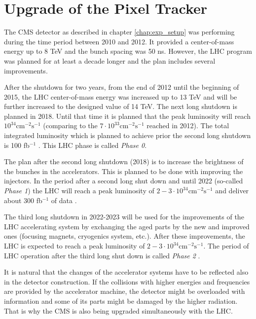 \chapter{Upgrade of the Pixel Tracker}\label{chapt:pixel}

The CMS detector as described in chapter \ref{chap:exp_setup} was performing during the time period 
between 2010 and 2012. It provided a center-of-mass energy up to 8 TeV and the bunch spacing was 50 ns. 
However, the LHC program was planned for at least a decade longer and the plan includes several improvements.

After the shutdown for two years, from the end of 2012 until the beginning of 2015, the LHC 
center-of-mass energy was increased up to 13 TeV and will be further increased to the designed value
of 14 TeV. The next long shutdown is planned in 2018. Until that time it is planned that the peak
luminosity will reach $10^{34} \text{cm}^{-2} \text{s}^{-1}$ (comparing to the $7 \cdot 10^{33} \text{cm}^{-2}\text{s}^{-1}$
reached in 2012). The total integrated luminosity which is planned to achieve prior the second long shutdown
is 100 fb$^{-1}$ \cite{CMS:2012sda}. This LHC phase is called \textit{Phase 0}.

The plan after the second long shutdown (2018) is to increase the brightness of the bunches
in the accelerators. This is planned to be done with improving the injectors. In the period 
after a second long shut down and until 2022 (so-called \textit{Phase 1}) the LHC will reach
a peak luminosity of $2-3 \cdot 10^{34} \text{cm}^{-2} \text{s}^{-1}$ and deliver about 
300 fb$^{-1}$ of data \cite{Rocca:2014soa}. 

The third long shutdown in 2022-2023 will be used for the improvements of the LHC accelerating system by
exchanging the aged parts by the new and improved ones (focusing magnets, cryogenics system, etc.).
After these improvements, the LHC is expected to reach a peak luminosity of $2-3 \cdot 10^{34} \text{cm}^{-2} \text{s}^{-1}$.
The period of LHC operation after the third long shut down is called \textit{Phase 2} \cite{Rocca:2014soa}.

It is natural that the changes of the accelerator systems have to be reflected also in the detector construction.
If the collisions with higher energies and frequencies are provided by the accelerator machine, the detector might
be overloaded with information and some of its parts might be damaged by the higher radiation. That is why 
the CMS is also being upgraded simultaneously with the LHC.

